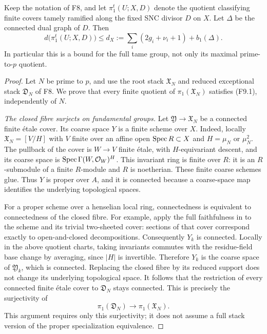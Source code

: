 \begin{lemma}
Keep the notation of F8, and let $\pi_1^t(U;X,D)$ denote the quotient
classifying finite covers tamely ramified along the fixed SNC divisor
$D$ on $X$. Let $\Delta$ be the connected dual graph of $D$. Then
\[
 d\bigl(\pi_1^t(U;X,D)\bigr)
 \leq d_X:=\sum_i(2g_i+\nu_i+1)+b_1(\Delta).
 \tag{F9.1}
\]
In particular this is a bound for the full tame group, not only its
maximal prime-to-$p$ quotient.
\end{lemma}
\begin{proof}
Let $N$ be prime to $p$, and use the root stack $\mathfrak X_N$
and reduced exceptional stack $\mathfrak D_N$ of F8. We prove
that every finite quotient of $\pi_1(\mathfrak X_N)$ satisfies
(F9.1), independently of $N$.

\emph{The closed fibre surjects on fundamental groups.}
Let $\mathfrak Y\to\mathfrak X_N$ be a connected finite \'etale
cover. Its coarse space $Y$ is a finite scheme over $X$.
Indeed, locally $\mathfrak X_N=[V/H]$ with $V$ finite over an
affine open $\operatorname{Spec} R\subset X$ and $H=\mu_N$ or $\mu_N^2$.
The pullback of the cover is $W\to V$ finite \'etale, with
$H$-equivariant descent, and its coarse space is
$\operatorname{Spec}\Gamma(W,\mathcal O_W)^H$. This invariant ring is finite
over $R$: it is an $R$-submodule of a finite $R$-module and $R$
is noetherian. These finite coarse schemes glue. Thus $Y$ is
proper over $A$, and it is connected because a coarse-space map
identifies the underlying topological spaces.

For a proper scheme over a henselian local ring, connectedness
is equivalent to connectedness of the closed fibre. For example,
apply the full faithfulness in
\cite[Lemma 58.9.1, tag 0A48]{StacksProperEtaleSpecialization}
to the scheme and its trivial two-sheeted cover: sections of that
cover correspond exactly to open-and-closed decompositions.
Consequently $Y_k$ is connected. Locally in the above quotient
charts, taking invariants commutes with the residue-field base
change by averaging, since $|H|$ is invertible. Therefore $Y_k$
is the coarse space of $\mathfrak Y_k$, which is connected.
Replacing the closed fibre by its reduced support does not change
its underlying topological space. It follows that the restriction
of every connected finite \'etale cover to $\mathfrak D_N$ stays
connected. This is precisely the surjectivity of
\[
 \pi_1(\mathfrak D_N)\longrightarrow\pi_1(\mathfrak X_N).
 \tag{F9.2}
\]
This argument requires only this surjectivity; it does not assume
a full stack version of the proper specialization equivalence.


\end{proof}
